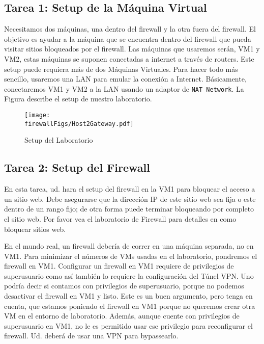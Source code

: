 \subsection{Tarea 1: Setup de la Máquina Virtual}

Necesitamos dos máquinas, una dentro del firewall y la otra fuera del firewall. El objetivo es ayudar a la máquina que se encuentra dentro del firewall que pueda visitar sitios bloqueados por el firewall.
Las máquinas que usaremos serán, VM1 y VM2, estas máquinas se suponen conectadas a internet a través de routers. Este setup puede requiera más de dos Máquinas Virtuales.
Para hacer todo más sencillo, usaremos una LAN para emular la conexión a Internet.
Básicamente, conectaremos VM1 y VM2 a la LAN usando un adaptor de \texttt{NAT Network}. 
La Figura describe el setup de nuestro laboratorio.


\begin{figure}[htb]
  \begin{center}
    \texttt{[image: \\firewallFigs/Host2Gateway.pdf]}
  \end{center}
  \caption{Setup del Laboratorio}
  \label{vpn_firewall:fig:labsetup}
\end{figure}



\subsection{Tarea 2: Setup del Firewall}

En esta tarea, ud. hara el setup del firewall en la VM1 para bloquear el acceso a un sitio web. Debe asegurarse que la dirección IP de este sitio web sea fija o este dentro de un rango fijo; de otra forma puede terminar bloqueando por completo el sitio web. Por favor vea el laboratorio de Firewall para detalles en como bloquear sitios web.

En el mundo real, un firewall debería de correr en una máquina separada, no en VM1. Para minimizar el números de VMs usadas en el laboratorio, pondremos el firewall en VM1. Configurar un firewall en VM1 requiere de privilegios de superusuario como así también lo requiere la configuración del Túnel VPN. Uno podría decir si contamos con privilegios de superusuario, porque no podemos desactivar el firewall en VM1 y listo. Este es un buen argumento, pero tenga en cuenta, que estamos poniendo el firewall en VM1 porque no queremos crear otra VM en el entorno de laboratorio. Además, aunque cuente con privilegios de superusuario en VM1, no le es permitido usar ese privilegio para reconfigurar el firewall. Ud. deberá de usar una VPN para bypassearlo.

